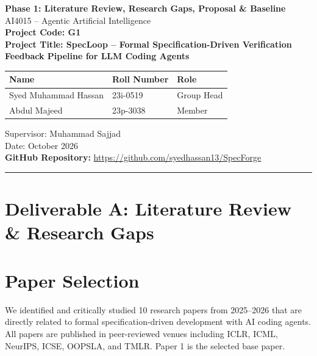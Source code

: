 \documentclass[11pt,a4paper]{article}
\begin{document}
\begin{center}
    {\LARGE\bfseries Phase 1: Literature Review, Research Gaps, Proposal \& Baseline} \\[0.5em]
    {\Large AI4015 -- Agentic Artificial Intelligence} \\[1em]
    {\large\bfseries Project Code: G1} \\[0.3em]
    {\large\bfseries Project Title: SpecLoop -- Formal Specification-Driven Verification Feedback Pipeline for LLM Coding Agents} \\[1em]
    
    \begin{tabular}{lll}
        \textbf{Name} & \textbf{Roll Number} & \textbf{Role} \\
        \midrule
        Syed Muhammad Hassan & 23i-0519 & Group Head \\
        Abdul Majeed & 23p-3038 & Member \\
    \end{tabular}
    
    \vspace{1em}
    {\large Supervisor: Muhammad Sajjad} \\[0.3em]
    {\large Date: October 2026} \\[0.5em]
    {\large\textbf{GitHub Repository:} \url{https://github.com/syedhassan13/SpecForge}}
\end{center}

\vspace{1em}
\hrule
\vspace{1em}

\tableofcontents
\newpage

\section*{Deliverable A: Literature Review \& Research Gaps}

\section{Paper Selection}

We identified and critically studied 10 research papers from 2025--2026 that are directly related to formal specification-driven development with AI coding agents. All papers are published in peer-reviewed venues including ICLR, ICML, NeurIPS, ICSE, OOPSLA, and TMLR. Paper 1 is the selected base paper.
\end{document}
